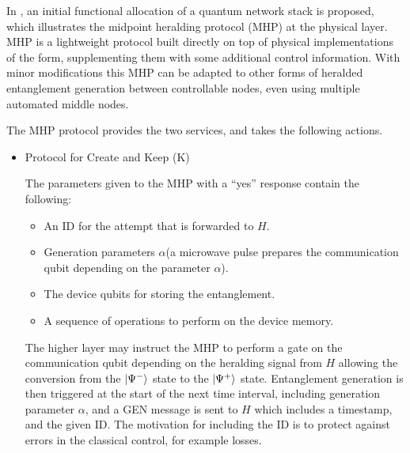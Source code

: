 \documentclass[10pt]{article}
\begin{document}
In \cite{dahlberg2019link}, an initial functional allocation of a quantum network stack is proposed, which illustrates the midpoint heralding protocol (MHP) at the physical layer. MHP is a lightweight protocol built directly on top of physical implementations of the form, supplementing them with some additional control information.
With minor modifications this MHP can be adapted to other forms of heralded entanglement generation between controllable nodes, even using multiple automated middle nodes.

The MHP protocol provides the two services, and takes the following actions.

\begin{itemize}
    \item  Protocol for Create and Keep (K)
    
    The parameters given to the MHP with a ``yes'' response contain the following:
    \begin{itemize}
        \item An ID for the attempt that is forwarded to $H$.
        \item Generation parameters $\alpha$(a microwave pulse prepares the communication
        qubit depending on the parameter $\alpha$).
        \item The device qubits for storing the entanglement.
        \item A sequence of operations to perform on the device memory.
    \end{itemize}
    The higher layer may instruct the MHP to perform a gate on the communication qubit depending on the heralding signal from $H$ allowing the conversion from the $\ket{\Psi^-}$ state to the $\ket{\Psi^+}$ state. Entanglement generation is then triggered at the start of the next time interval, including generation parameter $\alpha$, and a GEN message is sent to $H$ which includes a timestamp, and the given ID. The motivation for including the ID is to protect against errors in the classical control, for
    example losses.


\end{itemize}
\end{document}
